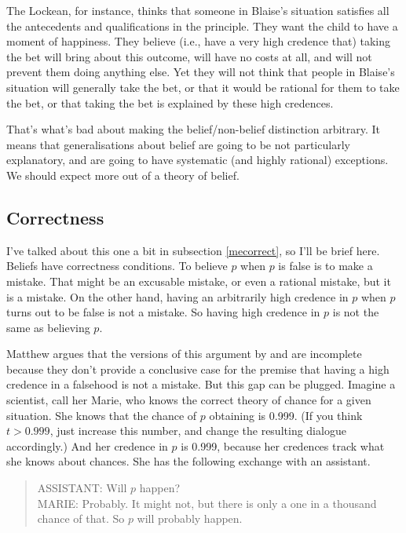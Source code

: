 \documentclass[11pt,]{book}
\begin{document}
The Lockean, for instance, thinks that someone in Blaise's situation satisfies all the antecedents and qualifications in the principle. They want the child to have a moment of happiness. They believe (i.e., have a very high credence that) taking the bet will bring about this outcome, will have no costs at all, and will not prevent them doing anything else. Yet they will not think that people in Blaise's situation will generally take the bet, or that it would be rational for them to take the bet, or that taking the bet is explained by these high credences.

That's what's bad about making the belief/non-belief distinction arbitrary. It means that generalisations about belief are going to be not particularly explanatory, and are going to have systematic (and highly rational) exceptions. We should expect more out of a theory of belief.

\hypertarget{lockecorrect}{%
\subsection{Correctness}\label{lockecorrect}}

I've talked about this one a bit in subsection \ref{mecorrect}, so I'll be brief here. Beliefs have correctness conditions. To believe \(p\) when \(p\) is false is to make a mistake. That might be an excusable mistake, or even a rational mistake, but it is a mistake. On the other hand, having an arbitrarily high credence in \(p\) when \(p\) turns out to be false is not a mistake. So having high credence in \(p\) is not the same as believing \(p\).

Matthew \citet{Lee2017a} argues that the versions of this argument by \citet{RossSchroeder2014} and \citet{FantlMcGrath2009} are incomplete because they don't provide a conclusive case for the premise that having a high credence in a falsehood is not a mistake. But this gap can be plugged. Imagine a scientist, call her Marie, who knows the correct theory of chance for a given situation. She knows that the chance of \(p\) obtaining is 0.999. (If you think \(t > 0.999\), just increase this number, and change the resulting dialogue accordingly.) And her credence in \(p\) is 0.999, because her credences track what she knows about chances. She has the following exchange with an assistant.

\begin{quote}
ASSISTANT: Will \(p\) happen?\\
MARIE: Probably. It might not, but there is only a one in a thousand chance of that. So \(p\) will probably happen.
\end{quote}
\end{document}
